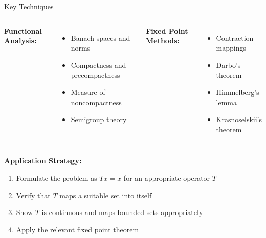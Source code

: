 \documentclass[aspectratio=169,10pt]{beamer}
\begin{document}
\begin{frame}{Key Techniques}
\begin{columns}[T]
\textbf{Functional Analysis:}
\begin{itemize}
    \item Banach spaces and norms
    \item Compactness and precompactness
    \item Measure of noncompactness
    \item Semigroup theory
\end{itemize}

\textbf{Fixed Point Methods:}
\begin{itemize}
    \item Contraction mappings
    \item Darbo's theorem
    \item Himmelberg's lemma
    \item Krasnoselskii's theorem
\end{itemize}
\end{columns}

\vspace{2em}
\textbf{Application Strategy:}
\begin{enumerate}
    \item Formulate the problem as $Tx = x$ for an appropriate operator $T$
    \item Verify that $T$ maps a suitable set into itself
    \item Show $T$ is continuous and maps bounded sets appropriately
    \item Apply the relevant fixed point theorem
\end{enumerate}
\end{frame}
\end{document}
